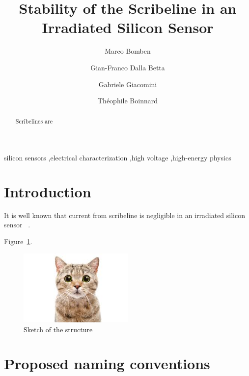 \documentclass[preprint,12pt]{elsarticle}
\begin{document}
\begin{frontmatter}
\title{Stability of the Scribeline in an Irradiated Silicon Sensor}
\author{Marco Bomben}
\author{Gian-Franco Dalla Betta}
\author{Gabriele Giacomini}

\author{Th\'eophile Boinnard}
\address{Brookhaven National Laboratory, Upton 11973, NY, U.S.A.}


\begin{abstract}
Scribelines are    
\end{abstract}

\begin{keyword}
silicon sensors  \sep electrical characterization \sep high voltage \sep high-energy physics
\end{keyword}

\end{frontmatter}



\section{Introduction}

It is well known that current from scribeline is negligible in an irradiated silicon sensor ~\cite{Sadrozinski:2013nja}. 


 Figure~\ref{fig:sketch}. 



\begin{figure}[h!]
\centering
\includegraphics[width=0.5\textwidth]{sketch.jpg}
\caption{\label{fig:sketch} Sketch of the structure}
\end{figure}


\section{Proposed naming conventions}
\label{sec:naming}
\end{document}

